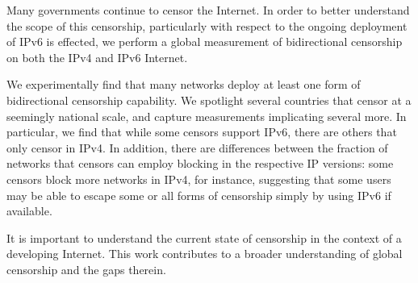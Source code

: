 Many governments continue to censor the Internet.
In order to better understand the scope of this censorship, particularly with respect
to the ongoing deployment of IPv6 is effected,
we perform a global measurement of bidirectional censorship on both the IPv4 and IPv6
Internet.

We experimentally find that many networks deploy at least one form of
bidirectional censorship capability. We spotlight several countries that censor at
a seemingly national scale, and capture measurements implicating several more.
In particular, we find that while some censors support IPv6, there are others that only
censor in IPv4. In addition, there are differences between the fraction
of networks that censors can employ blocking in the respective IP versions: some
censors block more networks in IPv4, for instance, suggesting that some users
may be able to escape some or all forms of censorship simply by using IPv6 if available.


It is important to understand the current state of censorship in the context of
a developing Internet. This work contributes to a broader understanding of
global censorship and the gaps therein.
